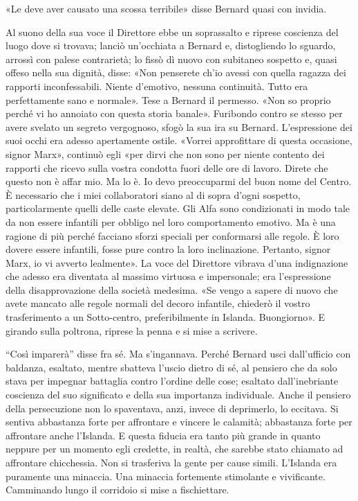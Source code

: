 \documentclass[
a5paper, %
10pt, %
twoside, 
onecolumn, %
openany, %
]{memoir}
\begin{document}
«Le deve aver causato una scossa terribile» disse Bernard quasi con invidia.

Al suono della sua voce il Direttore ebbe un soprassalto e riprese coscienza del luogo dove si trovava; lanciò un’occhiata a Bernard e, distogliendo lo sguardo, arrossì con palese contrarietà; lo fissò dì nuovo con subitaneo sospetto e, quasi offeso nella sua dignità, disse: «Non penserete ch’io avessi con quella ragazza dei rapporti inconfessabili. Niente d’emotivo, nessuna continuità. Tutto era perfettamente sano e normale». Tese a Bernard il permesso. «Non so proprio perché vi ho annoiato con questa storia banale». Furibondo contro se stesso per avere svelato un segreto vergognoso, sfogò la sua ira su Bernard. L’espressione dei suoi occhi era adesso apertamente ostile. «Vorrei approfittare di questa occasione, signor Marx», continuò egli «per dirvi che non sono per niente contento dei rapporti che ricevo sulla vostra condotta fuori delle ore di lavoro. Direte che questo non è affar mio. Ma lo è. Io devo preoccuparmi del buon nome del Centro. È necessario che i miei collaboratori siano al di sopra d’ogni sospetto, particolarmente quelli delle caste elevate. Gli Alfa sono condizionati in modo tale da non essere infantili per obbligo nel loro comportamento emotivo. Ma è una ragione di più perché facciano sforzi speciali per conformarsi alle regole. È loro dovere essere infantili, fosse pure contro la loro inclinazione. Pertanto, signor Marx, io vi avverto lealmente». La voce del Direttore vibrava d’una indignazione che adesso era diventata al massimo virtuosa e impersonale; era l’espressione della disapprovazione della società medesima. «Se vengo a sapere di nuovo che avete mancato alle regole normali del decoro infantile, chiederò il vostro trasferimento a un Sotto-centro, preferibilmente in Islanda. Buongiorno». E girando sulla poltrona, riprese la penna e si mise a scrivere.

“Così imparerà” disse fra sé. Ma s’ingannava. Perché Bernard usci dall’ufficio con baldanza, esaltato, mentre sbatteva l’uscio dietro di sé, al pensiero che da solo stava per impegnar battaglia contro l’ordine delle cose; esaltato dall’inebriante coscienza del suo significato e della sua importanza individuale. Anche il pensiero della persecuzione non lo spaventava, anzi, invece di deprimerlo, lo eccitava. Si sentiva abbastanza forte per affrontare e vincere le calamità; abbastanza forte per affrontare anche l’Islanda. E questa fiducia era tanto più grande in quanto neppure per un momento egli credette, in realtà, che sarebbe stato chiamato ad affrontare chicchessia. Non si trasferiva la gente per cause simili. L’Islanda era puramente una minaccia. Una minaccia fortemente stimolante e vivificante. Camminando lungo il corridoio si mise a fischiettare.
\end{document}
